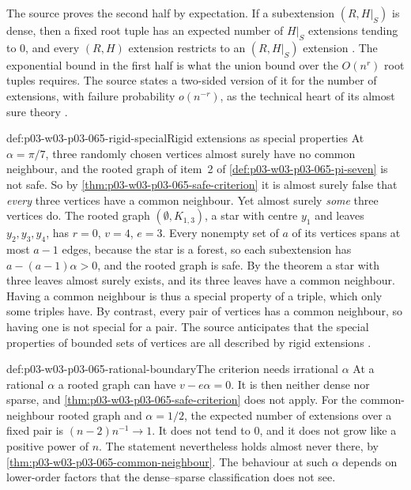 The source proves the second half by expectation.  If a subextension
\((R,H|_S)\) is dense, then a fixed root tuple has an expected number of
\(H|_S\) extensions tending to \(0\), and every \((R,H)\) extension restricts
to an \((R,H|_S)\) extension \cite[p.~7]{Spencer2007LogicRandomStructuresAuthor}.  The
exponential bound in the first half is what the union bound over the
\(O(n^r)\) root tuples requires.  The source states a two-sided version of it
for the number of extensions, with failure probability \(o(n^{-r})\), as the
technical heart of its almost sure theory \cite[pp.~10--11]{Spencer2007LogicRandomStructuresAuthor}.

\begin{hbexample}{def:p03-w03-p03-065-rigid-special}{Rigid extensions as special properties}
At \(\alpha=\pi/7\), three randomly chosen vertices almost surely have no
common neighbour, and the rooted graph of item~2 of
\cref{def:p03-w03-p03-065-pi-seven} is not safe.  So by
\cref{thm:p03-w03-p03-065-safe-criterion} it is almost surely false that
\emph{every} three vertices have a common neighbour.  Yet almost surely
\emph{some} three vertices do.  The rooted graph \((\emptyset,K_{1,3})\), a
star with centre \(y_1\) and leaves \(y_2,y_3,y_4\), has \(r=0\), \(v=4\),
\(e=3\).  Every nonempty set of \(a\) of its vertices spans at most \(a-1\)
edges, because the star is a forest, so each subextension has
\(a-(a-1)\alpha>0\), and the rooted graph is safe.  By the theorem a star
with three leaves almost surely exists, and its three leaves have a common
neighbour.  Having a common neighbour is thus a special property of a triple,
which only some triples have.  By contrast, every pair of vertices has a common
neighbour, so having one is not special for a pair.  The source anticipates
that the special properties of bounded sets of vertices are all described by
rigid extensions \cite[pp.~7--8]{Spencer2007LogicRandomStructuresAuthor}.
\end{hbexample}

\begin{hbwarning}{def:p03-w03-p03-065-rational-boundary}{The criterion needs irrational \(\alpha\)}
At a rational \(\alpha\) a rooted graph can have \(v-e\alpha=0\).  It is then
neither dense nor sparse, and \cref{thm:p03-w03-p03-065-safe-criterion} does
not apply.  For the common-neighbour rooted graph and \(\alpha=1/2\), the
expected number of extensions over a fixed pair is \((n-2)n^{-1}\to1\).  It
does not tend to \(0\), and it does not grow like a positive power of \(n\).
The statement nevertheless holds almost never there, by
\cref{thm:p03-w03-p03-065-common-neighbour}.  The behaviour at such
\(\alpha\) depends on lower-order factors that the dense--sparse
classification does not see.
\end{hbwarning}

